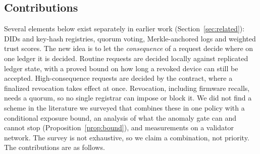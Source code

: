 \subsection{Contributions}
Several elements below exist separately in earlier work (Section~\ref{sec:related}): DIDs and key-hash registries, quorum voting, Merkle-anchored logs and weighted trust scores. The new idea is to let the \emph{consequence} of a request decide where on one ledger it is decided. Routine requests are decided locally against replicated ledger state, with a proved bound on how long a revoked device can still be accepted. High-consequence requests are decided by the contract, where a finalized revocation takes effect at once. Revocation, including firmware recalls, needs a quorum, so no single registrar can impose or block it. We did not find a scheme in the literature we surveyed that combines these in one policy with a conditional exposure bound, an analysis of what the anomaly gate can and cannot stop (Proposition~\ref{prop:bound}), and measurements on a validator network. The survey is not exhaustive, so we claim a combination, not priority. The contributions are as follows.
